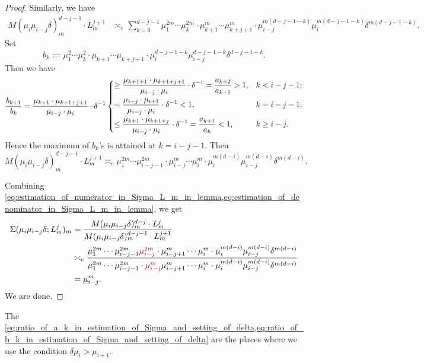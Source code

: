 \begin{proof}
	Similarly, we have
	\begin{align*}
		M(\mu_i \mu_{i-j} \delta)_m^{d-j-1} \cdot L_m^{j+1} & \asymp_e \sum_{k=0}^{d-j-1} \mu_1^{2m} \cdots \mu_k^{2m} \cdot \mu_{k+1}^m \cdots \mu_{k+j+1}^m \cdot \mu_{i-j}^{m(d-j-1-k)} \mu_i^{m(d-j-1-k)} \delta^{m(d-j-1-k)}.
	\end{align*}
	Set
	\[ b_k := \mu_1^2 \cdots \mu_k^2 \cdot \mu_{k+1} \cdots \mu_{k+j+1} \cdot \mu_i^{d-j-1-k} \mu_{i-j}^{d-j-1-k} \delta^{d-j-1-k}. \]
	Then we have
	\begin{equation}\label{eq:ratio_of_b_k_in_estimation_of_Sigma_and_setting_of_delta}
		\frac{b_{k+1}}{b_k} = \frac{\mu_{k+1} \cdot \mu_{k+1+j+1}}{\mu_{i-j} \cdot \mu_i} \cdot \delta^{-1}
		\begin{dcases}
			\geq \dfrac{\mu_{k+1+1} \cdot \mu_{k+1+j+1}}{\mu_{i-j} \cdot \mu_i} \cdot \delta^{-1} = \frac{a_{k+2}}{a_{k+1}} > 1, & k < i-j-1;  \\
			= \dfrac{\mu_{i-j} \cdot \mu_{i+1}}{\mu_{i-j} \cdot \mu_i} \cdot \delta^{-1} < 1,                                    & k = i-j-1;  \\
			\leq \dfrac{\mu_{k+1} \cdot \mu_{k+1+j}}{\mu_{i-j} \cdot \mu_i} \cdot \delta^{-1} = \frac{a_{k+1}}{a_k} < 1,         & k \geq i-j.
		\end{dcases}
	\end{equation}
	Hence the maximum of $b_k$'s is attained at $k = i-j-1$.
	Then
	\begin{equation}\label{eq:estimation_of_denominator_in_Sigma_L_m_in_lemma}
		M(\mu_i \mu_{i-j} \delta)_m^{d-j-1} \cdot L_m^{j+1} \asymp_e \mu_1^{2m} \cdots \mu_{i-j-1}^{2m} \cdot \mu_{i-j}^m \cdots \mu_{i}^m \cdot \mu_i^{m(d-i)} \mu_{i-j}^{m(d-i)} \delta^{m(d-i)}.
	\end{equation}

	Combining \cref{eq:estimation_of_numerator_in_Sigma_L_m_in_lemma,eq:estimation_of_denominator_in_Sigma_L_m_in_lemma}, we get
	\begin{align*}
		\Sigma(\mu_i \mu_{i-j} \delta; L_m^j)_m & = \frac{M(\mu_i \mu_{i-j} \delta)_m^{d-j} \cdot L_m^{j}}{M(\mu_i \mu_{i-j} \delta)_m^{d-j-1} \cdot L_m^{j+1}}                                                                                                                                                                                                               \\
		                                        & \asymp_e \frac{\mu_1^{2m} \cdots \mu_{i-j-1}^{2m} \alert{\mu_{i-j}^{2m}} \cdot \mu_{i-j+1}^m \cdots \mu_{i}^m \cdot \mu_i^{m(d-i)} \mu_{i-j}^{m(d-i)} \delta^{m(d-i)}}{\mu_1^{2m} \cdots \mu_{i-j-1}^{2m} \cdot \alert{\mu_{i-j}^m} \mu_{i-j+1}^m \cdots \mu_{i}^m \cdot \mu_i^{m(d-i)} \mu_{i-j}^{m(d-i)} \delta^{m(d-i)}} \\
		                                        & = \mu_{i-j}^{m}.
	\end{align*}
	We are done.
\end{proof}
\begin{remark}
	The \cref{eq:ratio_of_a_k_in_estimation_of_Sigma_and_setting_of_delta,eq:ratio_of_b_k_in_estimation_of_Sigma_and_setting_of_delta} are the places where we use the condition $\delta \mu_i > \mu_{i+1}$.
\end{remark}


